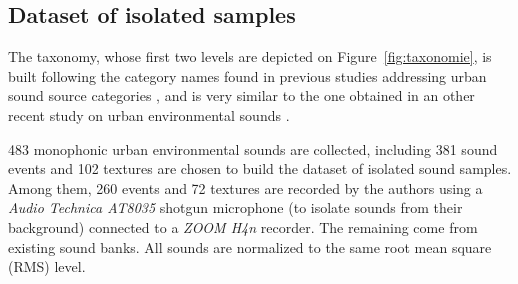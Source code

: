 \documentclass[twoside,twocolumn]{article}
\begin{document}
\subsection{Dataset of isolated samples}

The taxonomy, whose first two levels are depicted on Figure~\ref{fig:taxonomie}, is built following the category names found in previous studies addressing urban sound source categories \cite{maffiolo_caracterisation_1999,dubois2006cognitive,guastavino_categorization_2007, guastavino_ideal_2006, niessen_categories_2010, brown_towards_2011}, and is very similar to the one obtained in an other recent study on urban environmental sounds \cite{Salamon14}. 

483 monophonic urban environmental sounds are collected, including 381 sound events and 102 textures are chosen to build the dataset of isolated sound samples. Among them, 260 events and 72 textures are recorded by the authors using a \textit{Audio Technica AT8035} shotgun microphone (to isolate sounds from their background) connected to a \textit{ZOOM H4n} recorder. The remaining come from existing sound banks. All sounds are normalized to the same root mean square (RMS) level.
\end{document}
